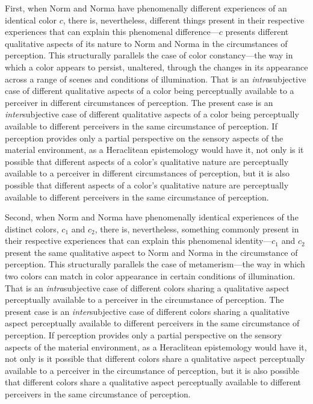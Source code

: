 \documentclass[12pt]{article}
\begin{document}
First, when Norm and Norma have phenomenally different experiences of an identical color $c$, there is, nevertheless, different things present in their respective experiences that can explain this phenomenal difference---$c$ presents different qualitative aspects of its nature to Norm and Norma in the circumstances of perception. This structurally parallels the case of color constancy---the way in which a color appears to persist, unaltered, through the changes in its appearance across a range of scenes and conditions of illumination. That is an \emph{intra}subjective case of different qualitative aspects of a color being perceptually available to a perceiver in different circumstances of perception. The present case is an \emph{inter}subjective case of different qualitative aspects of a color being perceptually available to different perceivers in the same circumstance of perception. If perception provides only a partial perspective on the sensory aspects of the material environment, as a Heraclitean epistemology would have it, not only is it possible that different aspects of a color's qualitative nature are perceptually available to a perceiver in different circumstances of perception, but it is also possible that different aspects of a color's qualitative nature are perceptually available to different perceivers in the same circumstance of perception.

Second, when Norm and Norma have phenomenally identical experiences of the distinct colors, $c_1$ and $c_2$, there is, nevertheless, something commonly present in their respective experiences that can explain this phenomenal identity---$c_1$ and $c_2$ present the same qualitative aspect to Norm and Norma in the circumstance of perception. This structurally parallels the case of metamerism---the way in which two colors can match in color appearance in certain conditions of illumination. That is an \emph{intra}subjective case of different colors sharing a qualitative aspect perceptually available to a perceiver in the circumstance of perception. The present case is an \emph{inter}subjective case of different colors sharing a qualitative aspect perceptually available to different perceivers in the same circumstance of perception. If perception provides only a partial perspective on the sensory aspects of the material environment, as a Heraclitean epistemology would have it, not only is it possible that different colors share a qualitative aspect perceptually available to a perceiver in the circumstance of perception, but it is also possible that different colors share a qualitative aspect perceptually available to different perceivers in the same circumstance of perception.
\end{document}
